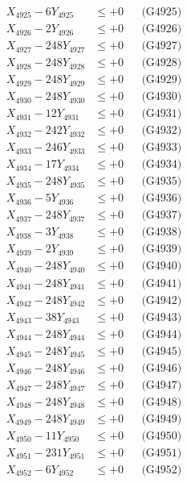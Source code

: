 \documentclass[a4paper,10pt]{article}
\begin{document}
{\begin{align}
X_{4925} - 6Y_{4925} &\leq +0 && \text{(G4925)} \\
X_{4926} - 2Y_{4926} &\leq +0 && \text{(G4926)} \\
X_{4927} - 248Y_{4927} &\leq +0 && \text{(G4927)} \\
X_{4928} - 248Y_{4928} &\leq +0 && \text{(G4928)} \\
X_{4929} - 248Y_{4929} &\leq +0 && \text{(G4929)} \\
X_{4930} - 248Y_{4930} &\leq +0 && \text{(G4930)} \\
\allowbreak
X_{4931} - 12Y_{4931} &\leq +0 && \text{(G4931)} \\
X_{4932} - 242Y_{4932} &\leq +0 && \text{(G4932)} \\
X_{4933} - 246Y_{4933} &\leq +0 && \text{(G4933)} \\
X_{4934} - 17Y_{4934} &\leq +0 && \text{(G4934)} \\
X_{4935} - 248Y_{4935} &\leq +0 && \text{(G4935)} \\
X_{4936} - 5Y_{4936} &\leq +0 && \text{(G4936)} \\
X_{4937} - 248Y_{4937} &\leq +0 && \text{(G4937)} \\
X_{4938} - 3Y_{4938} &\leq +0 && \text{(G4938)} \\
X_{4939} - 2Y_{4939} &\leq +0 && \text{(G4939)} \\
X_{4940} - 248Y_{4940} &\leq +0 && \text{(G4940)} \\
\allowbreak
X_{4941} - 248Y_{4941} &\leq +0 && \text{(G4941)} \\
X_{4942} - 248Y_{4942} &\leq +0 && \text{(G4942)} \\
X_{4943} - 38Y_{4943} &\leq +0 && \text{(G4943)} \\
X_{4944} - 248Y_{4944} &\leq +0 && \text{(G4944)} \\
X_{4945} - 248Y_{4945} &\leq +0 && \text{(G4945)} \\
X_{4946} - 248Y_{4946} &\leq +0 && \text{(G4946)} \\
X_{4947} - 248Y_{4947} &\leq +0 && \text{(G4947)} \\
X_{4948} - 248Y_{4948} &\leq +0 && \text{(G4948)} \\
X_{4949} - 248Y_{4949} &\leq +0 && \text{(G4949)} \\
X_{4950} - 11Y_{4950} &\leq +0 && \text{(G4950)} \\
\allowbreak
X_{4951} - 231Y_{4951} &\leq +0 && \text{(G4951)} \\
X_{4952} - 6Y_{4952} &\leq +0 && \text{(G4952)} \\

\end{align}}
\end{document}
